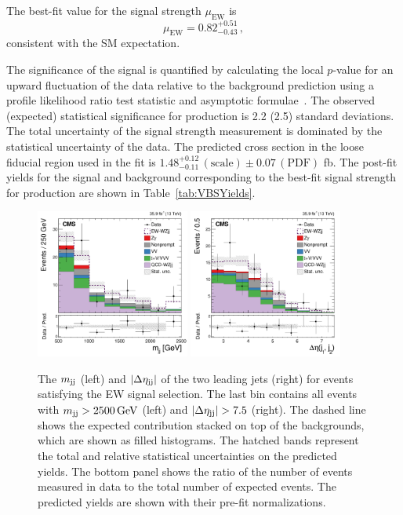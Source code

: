 The best-fit value for the signal strength $\mu_{\mathrm{EW}}$ is 
\begin{equation}
  \mu_{\mathrm{EW}} = 0.82^{+0.51}_{-0.43} \,,
\end{equation}
consistent with the SM expectation. 

The significance of the signal is quantified by calculating the local $p$-value
for an upward fluctuation of the data relative to the background prediction
using a profile likelihood ratio test statistic and asymptotic formulae~\cite{Cowan:2010js}.
The observed (expected) statistical significance for \EWWZ production is 2.2 (2.5) standard deviations. 
The total uncertainty of the signal strength
measurement is dominated by the statistical uncertainty of the data.
The predicted cross section in the loose fiducial region used in the fit is 
$1.48^{+0.12}_{-0.11} \,(\mathrm{scale}) \pm 0.07 \, (\mathrm{PDF})$ fb.
The post-fit yields for the signal and background corresponding to the best-fit signal strength 
for \EWWZ production are shown in
Table~\ref{tab:VBSYields}.

\begin{figure}[htbp]
  \centering
   \includegraphics[width=0.45\textwidth]{figures/AnalysisResults/mjj.pdf}
   \includegraphics[width=0.45\textwidth]{figures/AnalysisResults/dEtajj.pdf}
  \caption{
  The $m_{\mathrm{jj}}$ (left) and $\left|\Delta\eta_{\mathrm{jj}}\right|$ 
  of the two leading jets 
  (right) for events satisfying the EW signal selection. 
  The last bin contains all events with $m_{\mathrm{jj}} > 2500\,\text{Ge\hspace{-.08em}V}$ (left) and 
  $\left|\Delta\eta_{\mathrm{jj}}\right| > 7.5$ (right).
  The dashed line shows the expected \EWWZ contribution stacked
  on top of the backgrounds, which are shown as filled histograms. 
  The hatched bands represent the total and relative 
  statistical uncertainties on the predicted yields.
  The bottom panel shows the ratio of the number of events measured in data to the total 
  number of expected events. 
  The predicted yields are shown with their pre-fit normalizations.
          }
 \label{fig:VBSPlots}
\end{figure}

